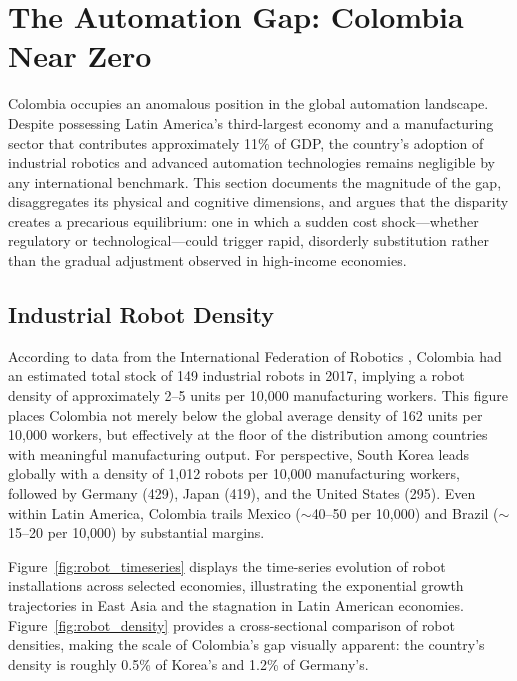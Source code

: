 \section{The Automation Gap: Colombia Near Zero}
\label{sec:automation_gap}

Colombia occupies an anomalous position in the global automation landscape. Despite possessing Latin America's third-largest economy and a manufacturing sector that contributes approximately 11\% of GDP, the country's adoption of industrial robotics and advanced automation technologies remains negligible by any international benchmark. This section documents the magnitude of the gap, disaggregates its physical and cognitive dimensions, and argues that the disparity creates a precarious equilibrium: one in which a sudden cost shock---whether regulatory or technological---could trigger rapid, disorderly substitution rather than the gradual adjustment observed in high-income economies.

\subsection{Industrial Robot Density}
\label{subsec:robot_density}

According to data from the International Federation of Robotics \cite{ifr2024}, Colombia had an estimated total stock of 149 industrial robots in 2017, implying a robot density of approximately 2--5 units per 10,000 manufacturing workers. This figure places Colombia not merely below the global average density of 162 units per 10,000 workers, but effectively at the floor of the distribution among countries with meaningful manufacturing output. For perspective, South Korea leads globally with a density of 1,012 robots per 10,000 manufacturing workers, followed by Germany (429), Japan (419), and the United States (295). Even within Latin America, Colombia trails Mexico ($\sim$40--50 per 10,000) and Brazil ($\sim$15--20 per 10,000) by substantial margins.

Figure~\ref{fig:robot_timeseries} displays the time-series evolution of robot installations across selected economies, illustrating the exponential growth trajectories in East Asia and the stagnation in Latin American economies. Figure~\ref{fig:robot_density} provides a cross-sectional comparison of robot densities, making the scale of Colombia's gap visually apparent: the country's density is roughly 0.5\% of Korea's and 1.2\% of Germany's.

